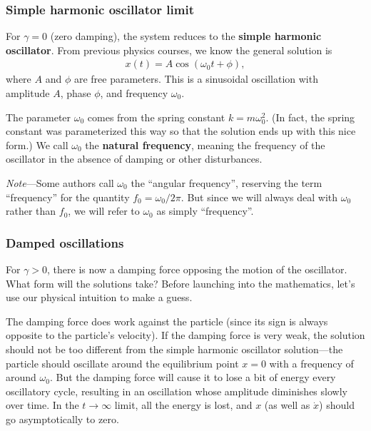 \documentclass[10pt,a4paper]{article}
\begin{document}
\subsubsection{Simple harmonic oscillator limit}

For $\gamma = 0$ (zero damping), the system reduces to the
\textbf{simple harmonic oscillator}. From previous physics courses, we
know the general solution is
\begin{align}
  x(t) = A \cos(\omega_0 t + \phi),
\end{align}
where $A$ and $\phi$ are free parameters. This is a sinusoidal
oscillation with amplitude $A$, phase $\phi$, and frequency
$\omega_0$.

The parameter $\omega_0$ comes from the spring constant $k =
m\omega_0^2$. (In fact, the spring constant was parameterized this way
so that the solution ends up with this nice form.) We call $\omega_0$
the \textbf{natural frequency}, meaning the frequency of the
oscillator in the absence of damping or other disturbances.

\begin{framed}\noindent
  \textit{Note}---Some authors call $\omega_0$ the ``angular
  frequency'', reserving the term ``frequency'' for the quantity $f_0
  = \omega_0/2\pi$.  But since we will always deal with $\omega_0$
  rather than $f_0$, we will refer to $\omega_0$ as simply
  ``frequency''.
\end{framed}
  
\subsubsection{Damped oscillations}
\label{damped-oscillations}

For $\gamma > 0$, there is now a damping force opposing the motion of
the oscillator. What form will the solutions take?  Before launching
into the mathematics, let's use our physical intuition to make a
guess.

The damping force does work against the particle (since its sign is
always opposite to the particle's velocity). If the damping force is
very weak, the solution should not be too different from the simple
harmonic oscillator solution---the particle should oscillate around
the equilibrium point $x = 0$ with a frequency of around
$\omega_0$. But the damping force will cause it to lose a bit of
energy every oscillatory cycle, resulting in an oscillation whose
amplitude diminishes slowly over time. In the $t \rightarrow \infty$
limit, all the energy is lost, and $x$ (as well as $\dot{x}$) should
go asymptotically to zero.
\end{document}
